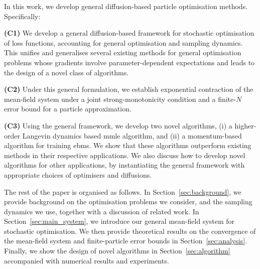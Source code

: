 In this work, we develop general diffusion-based particle optimisation methods. Specifically:

\textbf{(C1)} We develop a general diffusion-based framework for stochastic optimisation of loss functions, accounting for general optimisation and sampling dynamics. This unifies and generalises several existing methods for general optimisation problems whose gradients involve parameter-dependent expectations and leads to the design of a novel class of algorithms.

\textbf{(C2)} Under this general formulation, we establish exponential contraction of the mean-field system under a joint strong-monotonicity condition and a finite-$N$ error bound for a particle approximation.

\textbf{(C3)} Using the general framework, we develop two novel algorithms, (i) a higher-order Langevin dynamics based \gls*{mmle} algorithm, and (ii) a momentum-based algorithm for training \glspl*{ebm}. We show that these algorithms outperform existing methods in their respective applications. We also discuss how to develop novel algorithms for other applications, by instantiating the general framework with appropriate choices of optimisers and diffusions.

The rest of the paper is organised as follows. In Section~\ref{sec:background}, we provide background on the optimisation problems we consider, and the sampling dynamics we use, together with a discussion of related work. In Section~\ref{sec:main_system}, we introduce our general mean-field system for stochastic optimisation. We then provide theoretical results on the convergence of the mean-field system and finite-particle error bounds in Section~\ref{sec:analysis}. Finally, we show the design of novel algorithms in Section~\ref{sec:algorithm} accompanied with numerical results and experiments.

